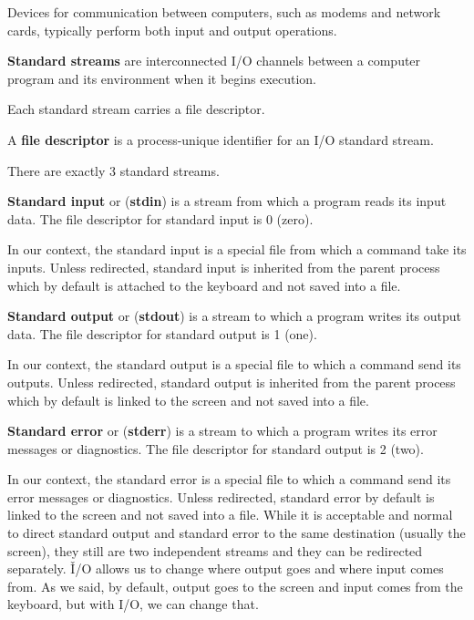 Devices for communication between computers, such as modems and network cards, typically perform both input and
output operations.
\ee

\textbf{Standard streams} are interconnected I/O channels between a computer program and its environment when it begins
execution.
\ed

Each standard stream carries a file descriptor.

A \textbf{file descriptor} is a process-unique identifier for an I/O standard stream.
\ed

There are exactly 3 standard streams.

\textbf{Standard input} or (\textbf{stdin}) is a stream from which a program reads its input data. The file descriptor
for standard input is 0 (zero).
\ed

In our context, the standard input is a special file from which a command take its inputs. Unless redirected,
standard input is inherited from the parent process which by default is attached to the keyboard and not saved into a
file.

\textbf{Standard output} or (\textbf{stdout}) is a stream to which a program writes its output data. The file descriptor
for standard output is 1 (one).
\ed

In our context, the standard output is a special file to which a command send its outputs. Unless redirected,
standard output is inherited from the parent process which by default is linked to the screen and not saved into a
file.

\textbf{Standard error} or (\textbf{stderr}) is a stream to which a program writes its error messages or diagnostics.
The file descriptor for standard output is 2 (two).
\ed

In our context, the standard error is a special file to which a command send its error messages or diagnostics.
Unless redirected, standard error by default is linked to the screen and not saved into a file. While it is acceptable
and normal to direct standard output and standard error to the same destination (usually the screen), they still are two
independent streams and they can be redirected separately. \v

I/O allows us to change where output goes and where input comes from. As we said, by default, output goes to the screen
and input comes from the keyboard, but with I/O, we can change that.

